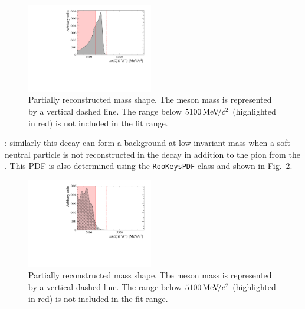 \begin{figure}[!h]
    \centering
    \includegraphics[width=0.49\textwidth]{figs/B2DsKK/Bs2Dsa1_4800_5900_Shape.pdf}
    \caption{Partially reconstructed \decay{\Bsb}{\Dsp\Km\Kstarz} mass shape. The \Bp meson mass is represented by a vertical dashed line. The range below $5100{\mathrm{\,Me\kern -0.1em V\!/}c^2}$ (highlighted in red) is not included in the fit range.}
    \label{fig:B2DsKK_part_reco_backgrounds_DsKKstar}   
\end{figure}

\begin{description}
\item \decay{\Bsb}{\Dssp\Km\Kstarz}: similarly this decay can form a background at low invariant mass when a soft neutral particle is not reconstructed in the  decay in addition to the pion from the \Kstarz. This PDF is also determined using the \texttt{RooKeysPDF} class and shown in Fig.~\ref{fig:B2DsKK_part_reco_backgrounds_DssKKstar}.
\end{description}

\begin{figure}[!h]
    \centering
    \includegraphics[width=0.49\textwidth]{figs/B2DsKK/Bs2DsstKKst_4800_5900_Shape.pdf}
    \caption{Partially reconstructed \decay{\Bsb}{\Dssp\Km\Kstarz} mass shape. The \Bp meson mass is represented by a vertical dashed line. The range below $5100{\mathrm{\,Me\kern -0.1em V\!/}c^2}$ (highlighted in red) is not included in the fit range.}
    \label{fig:B2DsKK_part_reco_backgrounds_DssKKstar}   
\end{figure}

